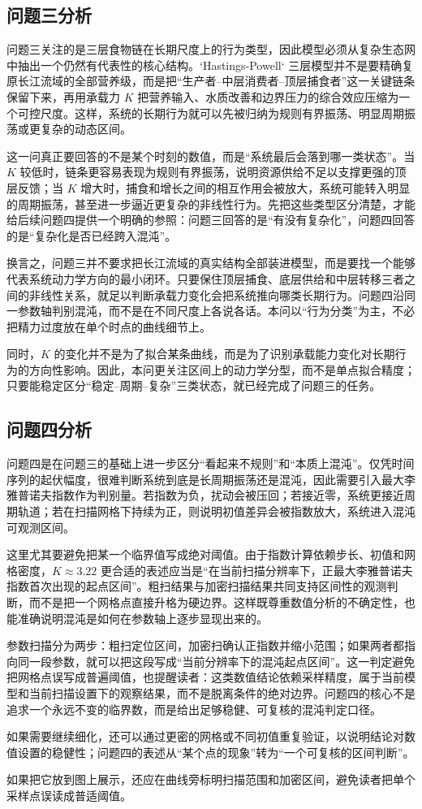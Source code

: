 \subsection{问题三分析}
问题三关注的是三层食物链在长期尺度上的行为类型，因此模型必须从复杂生态网中抽出一个仍然有代表性的核心结构。`Hastings-Powell` 三层模型并不是要精确复原长江流域的全部营养级，而是把“生产者--中层消费者--顶层捕食者”这一关键链条保留下来，再用承载力 \(K\) 把营养输入、水质改善和边界压力的综合效应压缩为一个可控尺度。这样，系统的长期行为就可以先被归纳为规则有界振荡、明显周期振荡或更复杂的动态区间。

这一问真正要回答的不是某个时刻的数值，而是“系统最后会落到哪一类状态”。当 \(K\) 较低时，链条更容易表现为规则有界振荡，说明资源供给不足以支撑更强的顶层反馈；当 \(K\) 增大时，捕食和增长之间的相互作用会被放大，系统可能转入明显的周期振荡，甚至进一步逼近更复杂的非线性行为。先把这些类型区分清楚，才能给后续问题四提供一个明确的参照：问题三回答的是“有没有复杂化”，问题四回答的是“复杂化是否已经跨入混沌”。

换言之，问题三并不要求把长江流域的真实结构全部装进模型，而是要找一个能够代表系统动力学方向的最小闭环。只要保住顶层捕食、底层供给和中层转移三者之间的非线性关系，就足以判断承载力变化会把系统推向哪类长期行为。问题四沿同一参数轴判别混沌，而不是在不同尺度上各说各话。本问以“行为分类”为主，不必把精力过度放在单个时点的曲线细节上。

同时，\(K\) 的变化并不是为了拟合某条曲线，而是为了识别承载能力变化对长期行为的方向性影响。因此，本问更关注区间上的动力学分型，而不是单点拟合精度；只要能稳定区分“稳定--周期--复杂”三类状态，就已经完成了问题三的任务。

\subsection{问题四分析}
问题四是在问题三的基础上进一步区分“看起来不规则”和“本质上混沌”。仅凭时间序列的起伏幅度，很难判断系统到底是长周期振荡还是混沌，因此需要引入最大李雅普诺夫指数作为判别量。若指数为负，扰动会被压回；若接近零，系统更接近周期轨道；若在扫描网格下持续为正，则说明初值差异会被指数放大，系统进入混沌可观测区间。

这里尤其要避免把某一个临界值写成绝对阈值。由于指数计算依赖步长、初值和网格密度，\(K\approx 3.22\) 更合适的表述应当是“在当前扫描分辨率下，正最大李雅普诺夫指数首次出现的起点区间”。粗扫结果与加密扫描结果共同支持区间性的观测判断，而不是把一个网格点直接升格为硬边界。这样既尊重数值分析的不确定性，也能准确说明混沌是如何在参数轴上逐步显现出来的。

参数扫描分为两步：粗扫定位区间，加密扫确认正指数并缩小范围；如果两者都指向同一段参数，就可以把这段写成“当前分辨率下的混沌起点区间”。这一判定避免把网格点误写成普遍阈值，也提醒读者：这类数值结论依赖采样精度，属于当前模型和当前扫描设置下的观察结果，而不是脱离条件的绝对边界。问题四的核心不是追求一个永远不变的临界数，而是给出足够稳健、可复核的混沌判定口径。

如果需要继续细化，还可以通过更密的网格或不同初值重复验证，以说明结论对数值设置的稳健性；问题四的表述从“某个点的现象”转为“一个可复核的区间判断”。

如果把它放到图上展示，还应在曲线旁标明扫描范围和加密区间，避免读者把单个采样点误读成普适阈值。
